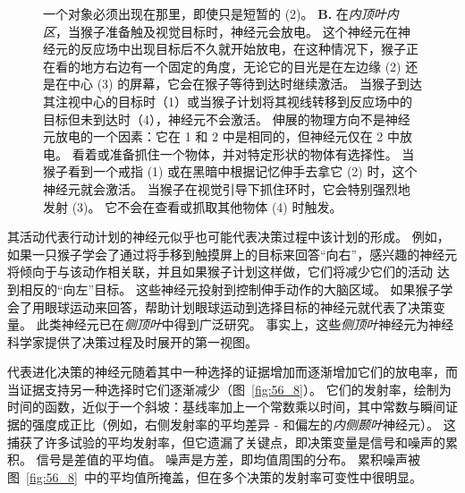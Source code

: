 \begin{figure}[htbp]
{		一个对象必须出现在那里，即使只是短暂的 (2)。
		\textbf{B.} 在\textit{内顶叶内区}，当猴子准备触及视觉目标时，神经元会放电。
		这个神经元在神经元的反应场中出现目标后不久就开始放电，在这种情况下，猴子正在看的地方右边有一个固定的角度，无论它的目光是在左边缘 (2) 还是在中心 (3) 的屏幕，它会在猴子等待到达时继续激活。
		当猴子到达其注视中心的目标时（1）或当猴子计划将其视线转移到反应场中的目标但未到达时（4），神经元不会激活。
		伸展的物理方向不是神经元放电的一个因素：它在 1 和 2 中是相同的，但神经元仅在 2 中放电。
		看着或准备抓住一个物体，并对特定形状的物体有选择性。
		当猴子看到一个戒指 (1) 或在黑暗中根据记忆伸手去拿它 (2) 时，这个神经元就会激活。
		当猴子在视觉引导下抓住环时，它会特别强烈地发射 (3)。
		它不会在查看或抓取其他物体 (4) 时触发。}
	\label{fig:56_7}
\end{figure}


其活动代表行动计划的神经元似乎也可能代表决策过程中该计划的形成。
例如，如果一只猴子学会了通过将手移到触摸屏上的目标来回答“向右”，感兴趣的神经元将倾向于与该动作相关联，并且如果猴子计划这样做，它们将减少它们的活动 达到相反的“向左”目标。
这些神经元投射到控制伸手动作的大脑区域。 如果猴子学会了用眼球运动来回答，帮助计划眼球运动到选择目标的神经元就代表了决策变量。
此类神经元已在\textit{侧顶叶}中得到广泛研究。
事实上，这些\textit{侧顶叶}神经元为神经科学家提供了决策过程及时展开的第一视图。


代表进化决策的神经元随着其中一种选择的证据增加而逐渐增加它们的放电率，而当证据支持另一种选择时它们逐渐减少（图~\ref{fig:56_8}）。
它们的发射率，绘制为时间的函数，近似于一个斜坡：基线率加上一个常数乘以时间，其中常数与瞬间证据的强度成正比（例如，右侧发射率的平均差异 - 和偏左的\textit{内侧颞叶}神经元）。
这捕获了许多试验的平均发射率，但它遗漏了关键点，即决策变量是信号和噪声的累积。
信号是差值的平均值。 噪声是方差，即均值周围的分布。
累积噪声被图~\ref{fig:56_8}~中的平均值所掩盖，但在多个决策的发射率可变性中很明显。



